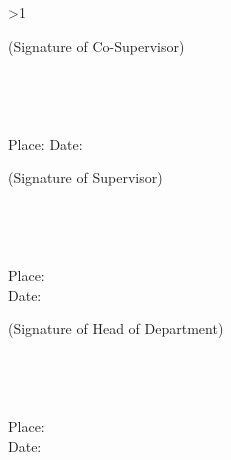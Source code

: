 \vspace{0.2cm}

\ifnum\GetHasCoSupervisor>1\relax
\begin{flushleft}
(Signature of Co-Supervisor)\\[0.1cm]
\textbf{\GetCoSupervisor}\\
\GetCoSupervisorDesignation\\
\GetCoSupervisorDept\\
\GetCollege\\[0.1cm]
Place: \underline{\hspace{3cm}} \hspace{2cm} Date: \underline{\hspace{3cm}}
\end{flushleft}
\vspace{0.3cm}
\fi
\ifnum{} \relax
\vspace{1.8cm}
\fi
\begin{minipage}[t]{0.47\textwidth}
\begin{flushleft}
(Signature of Supervisor)\\[0.2cm]
\textbf{\GetSupervisor}\\
\GetSupervisorDesignation\\
\GetSupervisorDept\\
\GetCollege\\[0.1cm]
Place: \underline{\hspace{2.5cm}}\\
Date: \underline{\hspace{2.5cm}}
\end{flushleft}
\end{minipage}%
\hfill
\begin{minipage}[t]{0.47\textwidth}
\begin{flushright}
(Signature of Head of Department)\\[0.2cm]
\textbf{\GetHoD}\\
\GetHoDDesignation\\
\GetHoDDept\\
\GetCollege\\[0.1cm]
Place: \underline{\hspace{2.5cm}}\\
Date: \underline{\hspace{2.5cm}}
\end{flushright}
\end{minipage}
\clearpage

\cleardoublepage
